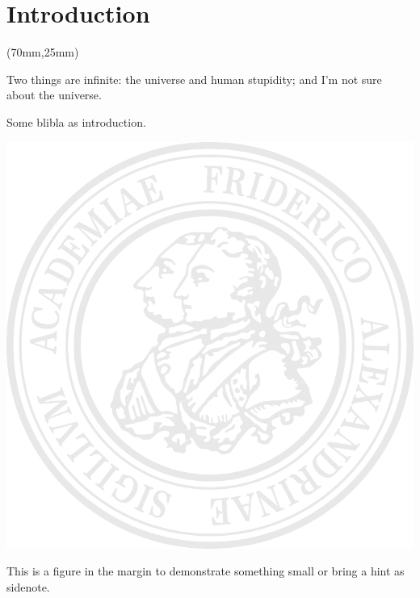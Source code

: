 
\chapter{Introduction}
\label{chap:intro}

\begin{textblock*}{.7\textwidth}(70mm,25mm)
    \begin{fquote}
        Two things are infinite: the universe and human stupidity; and I'm not sure about the universe.
    \end{fquote}
\end{textblock*}

Some blibla as introduction. \autocite{machowskiPowerSystemDynamics2020}

\begin{sidefigure}
    \begin{center}
        \includegraphics[width=.9\linewidth]{images/fausiegel.pdf}
    \end{center}
    \vspace*{-6pt}
    This is a figure in the margin to demonstrate something small or bring a hint as sidenote.
\end{sidefigure}

\lipsum[1]


